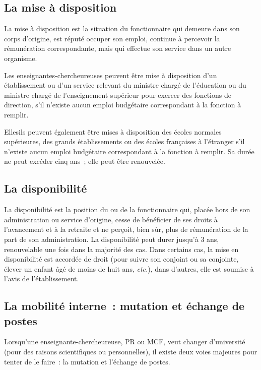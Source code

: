 \subsection*{La mise \`a disposition}

La mise \`a disposition est la situation du fonctionnaire qui demeure
dans son corps d'origine, est r\'eput\'e occuper son emploi, continue
\`a percevoir la r\'emun\'eration correspondante, mais qui effectue son
service dans un autre organisme.

Les enseignant\mp e\mp s-chercheur\mp euse\mp s peuvent \^etre mis\mp e \`a disposition d'un
\'etablissement ou d'un service relevant du ministre charg\'e de
l'\'education ou du ministre charg\'e de l'enseignement sup\'erieur
pour exercer des fonctions de direction, s'il n'existe aucun emploi
budg\'etaire correspondant \`a la fonction \`a remplir.

Elles\mp ils peuvent \'egalement \^etre mis\mp es \`a disposition des \'ecoles
normales sup\'erieures, des grands \'eta\-blis\-se\-ments ou des
\'ecoles fran\c caises \`a l'\'etranger s'il n'existe aucun emploi
budg\'etaire correspondant \`a la fonction \`a remplir. Sa dur\'ee
ne peut exc\'eder cinq ans~; elle peut \^etre renouvel\'ee.

\subsection*{La disponibilit\'e}

La disponibilit\'e est la position du ou de la fonctionnaire qui, plac\'e\mp e
hors de son administration ou service d'origine, cesse de
b\'en\'eficier de ses droits \`a l'avancement et \`a la retraite et
ne per\c coit, bien s\^ur, plus de r\'emun\'eration de la part de
son administration. La disponibilit\'e peut durer jusqu'\`a 3 ans,
renouvelable une fois dans la majorit\'e des cas. Dans certains cas,
la mise en disponibilit\'e est accord\'ee de droit (pour suivre son
conjoint ou sa conjointe, \'elever un enfant \^ag\'e de moins de huit ans, {\em
etc.}), dans d'autres, elle est soumise \`a l'avis de
l'\'etablissement.


\subsection{La mobilit\'e interne~: mutation et \'echange de postes}

Lorsqu'un\mp e enseignant\mp e-chercheur\mp euse, PR ou MCF, veut changer
d'universit\'e (pour des raisons scientifiques ou personnelles), il
existe deux voies majeures pour tenter de le faire~: la mutation et
l'\'echange de postes.

